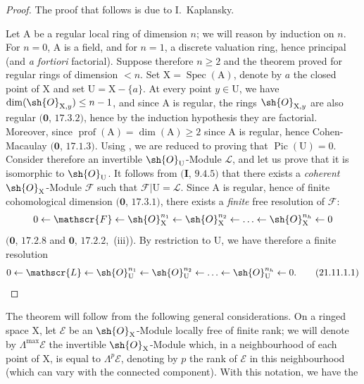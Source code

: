 \begin{proof}
The proof that follows is due to I.~Kaplansky.

Let $\mathrm{A}$ be a regular local ring of dimension $n$; we will reason by induction on $n$.
For $n=0$, $\mathrm{A}$ is a field, and for $n=1$, a discrete valuation ring, hence principal (and \emph{a fortiori} factorial).
Suppose therefore $n\geq 2$ and the theorem proved for regular rings of dimension $<n$.
Set $\mathrm{X}=\operatorname{Spec}(\mathrm{A})$, denote by $a$ the closed point of $\mathrm{X}$ and set $\mathrm{U}=\mathrm{X}-\{a\}$.
At every point $y\in\mathrm{U}$, we have $\dim(\sh{O}_{\mathrm{X},y})\leq n-1$, and since $\mathrm{A}$ is regular, the rings $\sh{O}_{\mathrm{X},y}$ are also regular $(\mathbf{0}$, $17.3.2)$, hence by the induction hypothesis they are factorial.
Moreover, since $\operatorname{prof}(\mathrm{A})=\dim(\mathrm{A})\geq 2$ since $\mathrm{A}$ is regular, hence Cohen-Macaulay $(\mathbf{0}$, $17.1.3)$.
Using , we are reduced to proving that $\operatorname{Pic}(\mathrm{U})=0$.
Consider therefore an invertible $\sh{O}_{\mathrm{U}}$-Module $\mathscr{L}$, and let us prove that it is isomorphic to $\sh{O}_{\mathrm{U}}$.
It follows from $(\mathbf{I}$, $9.4.5)$ that there exists a \emph{coherent} $\sh{O}_{\mathrm{X}}$-Module $\mathscr{F}$ such that $\mathscr{F}|\mathrm{U}=\mathscr{L}$.
Since $\mathrm{A}$ is regular, hence of finite cohomological dimension $(\mathbf{0}$, $17.3.1)$, there exists a \emph{finite} free resolution of $\mathscr{F}$:
\[
  0\leftarrow\mathscr{F}\leftarrow\sh{O}_{\mathrm{X}}^{n_1}\leftarrow\sh{O}_{\mathrm{X}}^{n_2}\leftarrow\ldots\leftarrow\sh{O}_{\mathrm{X}}^{n_h}\leftarrow 0
\]
$(\mathbf{0}$, $17.2.8$ and $\mathbf{0}$, $17.2.2$,~(iii)).
By restriction to $\mathrm{U}$, we have therefore a finite resolution
\[
\label{IV.21.11.1.1}
  0\leftarrow\mathscr{L}\leftarrow\sh{O}_{\mathrm{U}}^{n_1}\leftarrow\sh{O}_{\mathrm{U}}^{n_2}\leftarrow\ldots\leftarrow\sh{O}_{\mathrm{U}}^{n_h}\leftarrow 0.
  \tag{21.11.1.1}
\]
\end{proof}

The theorem will follow from the following general considerations.
On a ringed space $\mathrm{X}$, let $\mathscr{E}$ be an $\sh{O}_{\mathrm{X}}$-Module locally free of finite rank; we will denote by $\Lambda^{\max}\mathscr{E}$ the invertible $\sh{O}_{\mathrm{X}}$-Module which, in a neighbourhood of each point of $\mathrm{X}$, is equal to $\Lambda^p\mathscr{E}$, denoting by $p$ the rank of $\mathscr{E}$ in this neighbourhood (which can vary with the connected component).
With this notation, we have the

